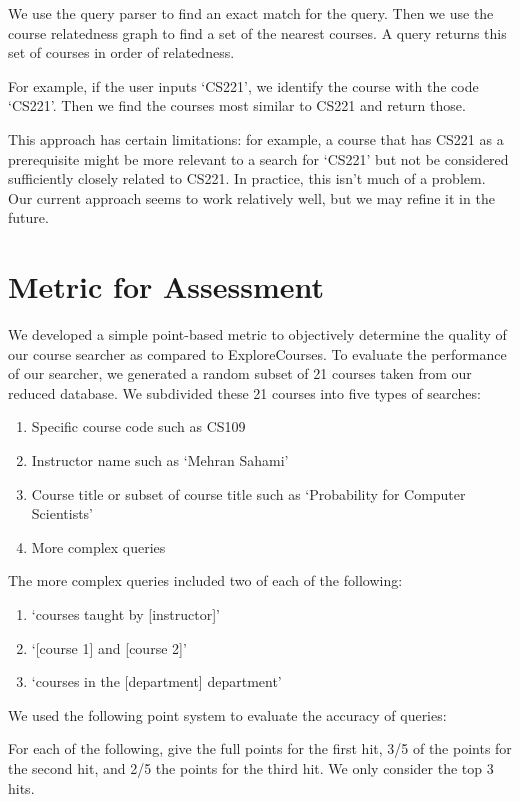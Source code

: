 \documentclass[12pt]{article}
\begin{document}
We use the query parser to find an exact match for the query. Then we
use the course relatedness graph to find a set of the nearest
courses. A query returns this set of courses in order of relatedness.

For example, if the user inputs `CS221', we identify the course with
the code `CS221'. Then we find the courses most similar to CS221 and
return those.

This approach has certain limitations: for example, a course that has
CS221 as a prerequisite might be more relevant to a search for `CS221'
but not be considered sufficiently closely related to CS221. In
practice, this isn't much of a problem. Our current approach seems to
work relatively well, but we may refine it in the future.

\section*{Metric for Assessment}
We developed a simple point-based metric to objectively determine the
quality of our course searcher as compared to ExploreCourses. To
evaluate the performance of our searcher, we generated a random subset
of 21 courses taken from our reduced database. We subdivided these 21
courses into five types of searches: 

\begin{enumerate}
\item Specific course code such as CS109
\item Instructor name such as `Mehran Sahami'
\item Course title or subset of course title such as `Probability for Computer Scientists'
\item More complex queries
\end{enumerate}

\noindent The more complex queries included two of each of the following: 

\begin{enumerate}
\item `courses taught by [instructor]'
\item `[course 1] and [course 2]'
\item `courses in the [department] department'
\end{enumerate}

We used the following point system to evaluate the accuracy of queries: 

For each of the following, give the full points for the first hit, 3/5
of the points for the second hit, and 2/5 the points for the third
hit. We only consider the top 3 hits.
\end{document}

